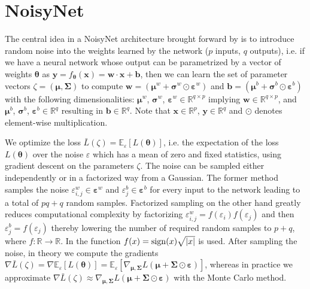 \clearpage
\hypertarget{algo-noisynet}{\section{NoisyNet}}

\noindent The central idea in a NoisyNet architecture brought forward by \cite{noisynet-paper} is to introduce random noise into the weights learned by the network ($p$ inputs, $q$ outputs), i.e. if we have a neural network whose output can be parametrized by a vector of weights $\boldsymbol{\theta}$ as $\textbf{y} = f_{\boldsymbol{\theta}}(\textbf{x}) = \textbf{w} \cdot \textbf{x} + \textbf{b}$, then we can learn the set of parameter vectors $\zeta = (\boldsymbol{\mu}, \boldsymbol{\Sigma})$ to compute $\textbf{w} = (\boldsymbol{\mu}^{w} + \boldsymbol{\sigma}^{w} \odot \boldsymbol{\varepsilon}^{w})$ and $\textbf{b} = (\boldsymbol{\mu}^{b} + \boldsymbol{\sigma}^{b} \odot \boldsymbol{\varepsilon}^{b})$ with the following dimensionalities: $\boldsymbol{\mu}^{w}$, $\boldsymbol{\sigma}^{w}$, $\boldsymbol{\varepsilon}^{w} \in \mathbb{R}^{q \times p}$ implying $\textbf{w} \in \mathbb{R}^{q \times p}$, and $\boldsymbol{\mu}^{b}$, $\boldsymbol{\sigma}^{b}$, $\boldsymbol{\varepsilon}^{b} \in \mathbb{R}^{q}$ resulting in $\textbf{b} \in \mathbb{R}^{q}$. Note that $\textbf{x} \in \mathbb{R}^{p}$, $\textbf{y} \in \mathbb{R}^{q}$ and $\odot$ denotes element-wise multiplication.

\noindent We optimize the loss $\bar{L}(\zeta) = \mathbb{E}_{\varepsilon}[L(\boldsymbol{\theta})]$, i.e. the expectation of the loss $L(\boldsymbol{\theta})$ over the noise $\varepsilon$ which has a mean of zero and fixed statistics, using gradient descent on the parameters $\zeta$. The noise can be sampled either independently or in a factorized way from a Gaussian. The former method samples the noise $\varepsilon^{w}_{i,j} \in \boldsymbol{\varepsilon}^{w}$ and $\varepsilon^{b}_{j} \in \boldsymbol{\varepsilon}^{b}$ for every input to the network leading to a total of $pq + q$ random samples. Factorized sampling on the other hand greatly reduces computational complexity by factorizing $\varepsilon^{w}_{i,j} = f(\varepsilon_{i}) f(\varepsilon_{j})$ and then $\varepsilon^{b}_{j} = f(\varepsilon_{j})$ thereby lowering the number of required random samples to $p + q$, where $f: \mathbb{R} \rightarrow \mathbb{R}$. In \cite{noisynet-paper} the function $f(x) = \operatorname{sign}(x) \sqrt{|x|}$ is used. After sampling the noise, in theory we compute the gradients $\nabla\bar{L}(\zeta) = \nabla\mathbb{E}_{\varepsilon}[L(\boldsymbol{\theta})] = \mathbb{E}_{\varepsilon}[\nabla_{\boldsymbol{\mu}, \boldsymbol{\Sigma}}L(\boldsymbol{\mu} + \boldsymbol{\Sigma} \odot \boldsymbol{\varepsilon})]$, whereas in practice we approximate $\nabla\bar{L}(\zeta) \approx \nabla_{\boldsymbol{\mu}, \boldsymbol{\Sigma}}L(\boldsymbol{\mu} + \boldsymbol{\Sigma} \odot \boldsymbol{\varepsilon})$ with the Monte Carlo method.

